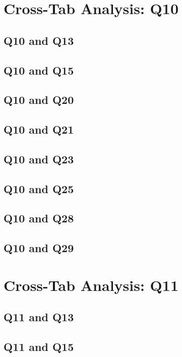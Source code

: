 \documentclass{report}
\begin{document}
\chapter{Cross-Tab Analysis: Q10}

\section{Q10 and Q13}\clearpage
\section{Q10 and Q15}\clearpage
\section{Q10 and Q20}\clearpage
\section{Q10 and Q21}\clearpage
\section{Q10 and Q23}\clearpage
\section{Q10 and Q25}\clearpage
\section{Q10 and Q28}\clearpage
\section{Q10 and Q29}\clearpage

\chapter{Cross-Tab Analysis: Q11}

\section{Q11 and Q13}\clearpage
\section{Q11 and Q15}\clearpage
\end{document}
